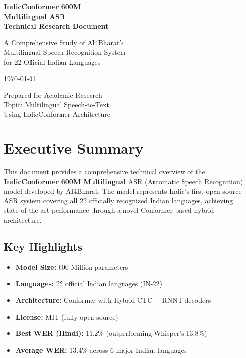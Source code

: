 \documentclass[12pt,a4paper]{article}
\begin{document}
\begin{titlepage}
\centering
\vspace*{2cm}
{\Huge\bfseries IndicConformer 600M\\[0.3cm]
Multilingual ASR\\[0.5cm]
Technical Research Document\par}
\vspace{2cm}
{\Large A Comprehensive Study of AI4Bharat's\\
Multilingual Speech Recognition System\\[0.5cm]
for 22 Official Indian Languages\par}
\vspace{2cm}
{\large \today\par}
\vfill
{\large Prepared for Academic Research\\
Topic: Multilingual Speech-to-Text\\
Using IndicConformer Architecture\par}
\end{titlepage}

\tableofcontents
\newpage

\section{Executive Summary}

This document provides a comprehensive technical overview of the \textbf{IndicConformer 600M Multilingual} ASR (Automatic Speech Recognition) model developed by AI4Bharat. The model represents India's first open-source ASR system covering all 22 officially recognized Indian languages, achieving state-of-the-art performance through a novel Conformer-based hybrid architecture.

\subsection{Key Highlights}

\begin{itemize}[leftmargin=*]
\item \textbf{Model Size:} 600 Million parameters
\item \textbf{Languages:} 22 official Indian languages (IN-22)
\item \textbf{Architecture:} Conformer with Hybrid CTC + RNNT decoders
\item \textbf{License:} MIT (fully open-source)
\item \textbf{Best WER (Hindi):} 11.2\% (outperforming Whisper's 13.8\%)
\item \textbf{Average WER:} 13.4\% across 6 major Indian languages
\end{itemize}
\end{document}
